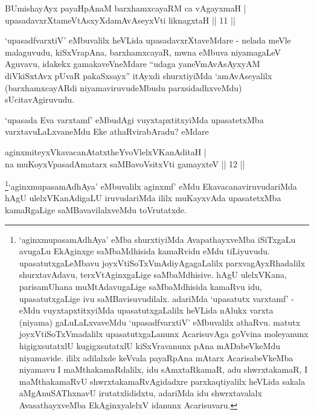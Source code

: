 \begin{shl}
BUmishayAyx payaHpAnaM barxhamxcayaRM ca vAgayxmaH | \\
upasadavxrXtameVtAsxyXdamAvAseyxVti liknagxtaH \hfill|| 11 || 
\end{shl}

\begin{artha}
`upasadfvarxtiV' eMbuvalilx heVLida upasadavxrXtaveMdare - nelada meVle malaguvudu, kiSxVrapAna, barxhamxcayaR, mwna eMbuva niyamagaLeV Aguvavu, idakekx gamakaveVneMdare ``udaga yaneV\s mAvAsAyxyAM diVkiSxtAvx pUvaR pakaSxsayx'' itAyxdi shurxtiyiMda `amAvAseyalilx (barxhamxcayARdi niyamaviruvudeMbudu parxsidadhxveMdu) sUcitavAgiruvudu.
\end{artha}

\begin{artha}
`upasada Eva varxtamf' eMbudAgi vuyxtapxtitxyiMda upasatetxMba varxtavuLaLxvaneMdu Eke athaRvirabAradu? eMdare
\end{artha}

\begin{shl}
aginxmiteyxVkavacanAtatxtheYvoVlelxVKanAditaH | \\
na muKoyxVpasadAmatarx saMBavoV\s sitxVti gamayxteV \hfill|| 12 || 
\end{shl}

\begin{artha}
\footnote{`aginxmupasamAdhAya' eMba shurxtiyiMda AvapathayxveMba iSiTxgaLu avugaLu EkAginxge saMbaMdhisida kamaRvidu eMdu tiLiyuvudu. upasatutxgaLeMbavu joyxVtiSoTxVmAdiyAgagaLalilx parxvagAyxRhadalilx shurxtavAdavu, terxVtAginxgaLige saMbaMdhisive. hAgU ulelxVKana, parisamUhana muMtAdavugaLige saMbaMdhisida kamaRvu idu, upasatutxgaLige ivu saMBavisuvudilalx. adariMda `upasatutx varxtamf' - eMdu vuyxtapxtitxyiMda upasatutxgaLalilx heVLida nAlukx varxta (niyama) gaLuLaLxvaveMdu `upasadfvarxtiV' eMbuvalilx athaRvu. matutx joyxVtiSoTxVmadalilx upasatutxgaLanunx AcarisuvAga goVvina moleyanunx higigxsutatxlU kugigxsutatxlU kiSxVravanunx pAna mADabeVkeMdu niyamavide. ililx adilalxde keVvala payaRpAna mAtarx AcarisabeVkeMba niyamavu I maMthakamaRdalilx, idu sAmxtaRkamaR, adu shwrxtakamaR, I maMthakamaRvU shwrxtakamaRvAgidadxre parxkaqtiyalilx heVLida sakala aMgAnuSAThxnavU irutatxlididxtu, adariMda idu shwrxtavalalx AvasathayxveMba EkAginxyalelxV idanunx Acarisuvaru.}`aginxmupasamAdhAya' eMbuvalilx aginxmf' eMdu EkavacanaviruvudariMda hAgU ulelxVKanAdigaLU iruvudariMda ililx muKayxvAda upasatetxMba kamaRgaLige saMBavavilalxveMdu toVrutatxde.
\end{artha}

